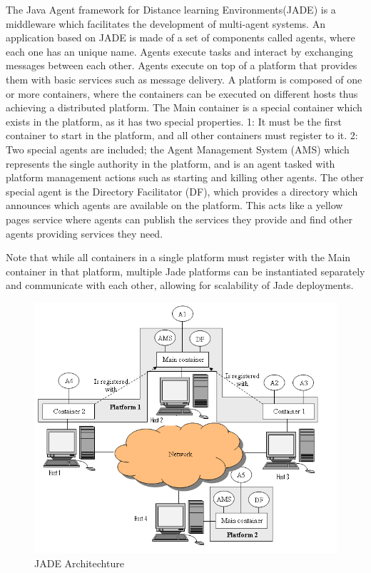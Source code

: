 The Java Agent framework for Distance learning Environments(JADE) is a middleware which facilitates the development of multi-agent systems. An application based on JADE is made of a set of components called agents, where each one has an unique name. Agents execute tasks and interact by exchanging messages between each other. Agents execute on top of a platform that provides them with basic services such as message delivery. A platform is composed of one or more containers, where the containers can be executed on different hosts thus achieving a distributed platform. The Main container is a special container which exists in the platform, as it has two special properties. 1: It must be the first container to start in the platform, and all other containers must register to it. 2: Two special agents are included; the Agent Management System (AMS) which represents the single authority in the platform, and is an agent tasked with platform management actions such as starting and killing other agents. The other special agent is the Directory Facilitator (DF), which provides a directory which announces which agents are available on the platform. This acts like a yellow pages service where agents can publish the services they provide and find other agents providing services they need.

 Note that while all containers in a single platform must register with the Main container in that platform, multiple Jade platforms can be instantiated separately and communicate with each other, allowing for scalability of Jade deployments.
 
 \begin{figure}[h!]
 	\centering
	 	\includegraphics[width=\textwidth]{fig/jadeArchitecture}
	 	\caption{JADE Architechture}
	 	\label{fig:JADEarchitechture}
 \end{figure}


